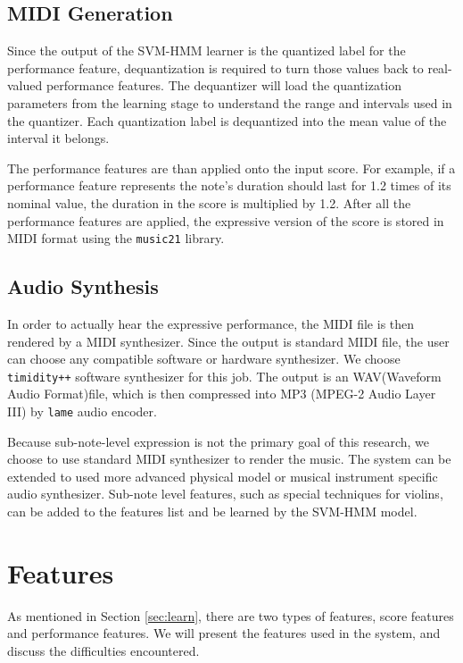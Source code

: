       
\subsection{MIDI Generation}
  Since the output of the SVM-HMM learner is the quantized label for the performance feature, dequantization is required to turn those values back to real-valued performance features. The dequantizer will load the quantization parameters from the learning stage to understand the range and intervals used in the quantizer. Each quantization label is dequantized into the mean value of the interval it belongs.

  The performance features are than applied onto the input score. For example, if a performance feature represents the note's duration should last for 1.2 times of its nominal value, the duration in the score is multiplied by 1.2. After all the performance features are applied, the expressive version of the score is stored in MIDI format using the \texttt{music21} library.

\subsection{Audio Synthesis}
In order to actually hear the expressive performance, the MIDI file is then rendered by a MIDI synthesizer. Since the output is standard MIDI file, the user can choose any compatible software or hardware synthesizer. We choose \texttt{timidity++} software synthesizer for this job. The output is an WAV(Waveform Audio Format)file, which is then compressed into MP3 (MPEG-2 Audio Layer III) by \texttt{lame} audio encoder.

Because sub-note-level expression is not the primary goal of this research, we choose to use standard MIDI synthesizer to render the music. The system can be extended to used more advanced physical model or musical instrument specific audio synthesizer. Sub-note level features, such as special techniques for violins, can be added to the features list and be learned by the SVM-HMM model.
   
\section{Features}
   As mentioned in Section \ref{sec:learn}, there are two types of features, score features and performance features. We will present the features used in the system, and discuss the difficulties encountered.
